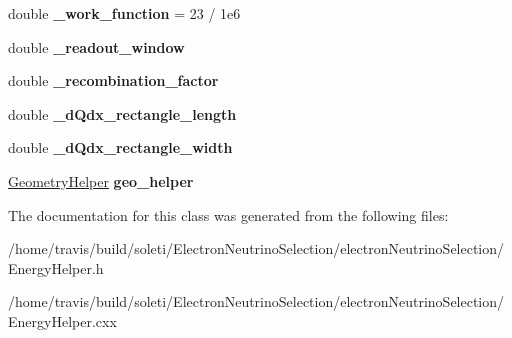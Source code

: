 \begin{DoxyCompactItemize}
\item 
\hypertarget{group__lee_gafed9eac818bc9ab7f0c0cd3c808feeea}{double {\bfseries \-\_\-work\-\_\-function} = 23 / 1e6}\label{group__lee_gafed9eac818bc9ab7f0c0cd3c808feeea}

\item 
\hypertarget{group__lee_gad704feff08cf9f09aa46f306e126bbbb}{double {\bfseries \-\_\-readout\-\_\-window}}\label{group__lee_gad704feff08cf9f09aa46f306e126bbbb}

\item 
\hypertarget{group__lee_gafbe2338334b0bb800473d29350d866d1}{double {\bfseries \-\_\-recombination\-\_\-factor}}\label{group__lee_gafbe2338334b0bb800473d29350d866d1}

\item 
\hypertarget{group__lee_gaffce1a06abee9651a41c454aa5f9032f}{double {\bfseries \-\_\-d\-Qdx\-\_\-rectangle\-\_\-length}}\label{group__lee_gaffce1a06abee9651a41c454aa5f9032f}

\item 
\hypertarget{group__lee_ga227149dafb056c355057c753ac768b13}{double {\bfseries \-\_\-d\-Qdx\-\_\-rectangle\-\_\-width}}\label{group__lee_ga227149dafb056c355057c753ac768b13}

\item 
\hypertarget{group__lee_ga613fe58326a28695ad83ddd7bdf8ff57}{\hyperlink{classlee_1_1GeometryHelper}{Geometry\-Helper} {\bfseries geo\-\_\-helper}}\label{group__lee_ga613fe58326a28695ad83ddd7bdf8ff57}

\end{DoxyCompactItemize}


The documentation for this class was generated from the following files\-:\begin{DoxyCompactItemize}
\item 
/home/travis/build/soleti/\-Electron\-Neutrino\-Selection/electron\-Neutrino\-Selection/Energy\-Helper.\-h\item 
/home/travis/build/soleti/\-Electron\-Neutrino\-Selection/electron\-Neutrino\-Selection/Energy\-Helper.\-cxx\end{DoxyCompactItemize}
